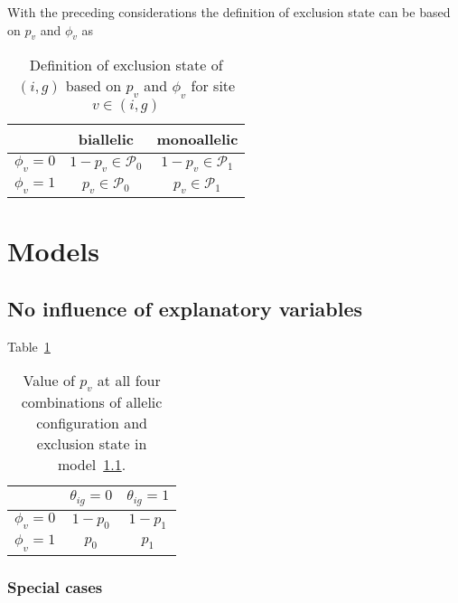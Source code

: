 \documentclass[letterpaper]{article}
\begin{document}
With the preceding considerations the definition of exclusion state can be
based on \(p_v\) and \(\phi_v\) as
\begin{table}[h]
\begin{center}
\begin{tabular}{c|cc|}
& biallelic & monoallelic \\
\hline
\(\phi_v=0\) & \(1-p_v \in \mathcal{P}_0\) & \(1-p_v \in \mathcal{P}_1\) \\
\(\phi_v=1\) & \(p_v \in \mathcal{P}_0\) & \(p_v \in \mathcal{P}_1\) \\
\hline
\end{tabular}
\caption{
Definition of exclusion state of \((i,g)\) based on \(p_v\) and \(\phi_v\) for
site \(v\in(i,g)\)
}
\end{center}
\end{table}

\section{Models}
\label{sec:models}

\renewcommand{\thesubsection}{M\arabic{model}}

\subsection{No influence of explanatory variables }
\label{sec:model-basic}

Table~\ref{tab:model-basic}

\begin{table}[h]
\begin{center}
\begin{tabular}{c|cc|}
& \(\theta_{ig}=0\) & \(\theta_{ig}=1\) \\
\hline
\(\phi_v=0\) & \(1-p_0\) & \(1-p_1\) \\
\(\phi_v=1\) & \(p_0\) & \(p_1\) \\
\hline
\end{tabular}
\caption{
Value of \(p_v\) at all four combinations of allelic configuration and exclusion
state in model~\ref{sec:model-basic}.
}
\label{tab:model-basic}
\end{center}
\end{table}

\subsubsection{Special cases}
\end{document}
